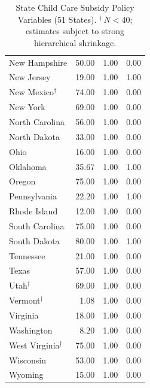 \begin{table}[htbp]
\begin{tabular}{lrrr}
  New Hampshire & 50.00 & 1.00 & 0.00 \\ 
  New Jersey & 19.00 & 1.00 & 1.00 \\ 
  New Mexico$^{\dagger}$ & 74.00 & 1.00 & 0.00 \\ 
  New York & 69.00 & 1.00 & 0.00 \\ 
  North Carolina & 56.00 & 1.00 & 0.00 \\ 
  North Dakota & 33.00 & 1.00 & 0.00 \\ 
  Ohio & 16.00 & 1.00 & 0.00 \\ 
  Oklahoma & 35.67 & 1.00 & 1.00 \\ 
  Oregon & 75.00 & 1.00 & 0.00 \\ 
  Pennsylvania & 22.20 & 1.00 & 1.00 \\ 
  Rhode Island & 12.00 & 1.00 & 0.00 \\ 
  South Carolina & 75.00 & 1.00 & 0.00 \\ 
  South Dakota & 80.00 & 1.00 & 1.00 \\ 
  Tennessee & 21.00 & 1.00 & 0.00 \\ 
  Texas & 57.00 & 1.00 & 0.00 \\ 
  Utah$^{\dagger}$ & 69.00 & 1.00 & 0.00 \\ 
  Vermont$^{\dagger}$ & 1.08 & 1.00 & 0.00 \\ 
  Virginia & 18.00 & 1.00 & 0.00 \\ 
  Washington & 8.20 & 1.00 & 0.00 \\ 
  West Virginia$^{\dagger}$ & 75.00 & 1.00 & 0.00 \\ 
  Wisconsin & 53.00 & 1.00 & 0.00 \\ 
  Wyoming & 15.00 & 1.00 & 0.00 \\ 
   \bottomrule
\end{tabular}
\caption{State Child Care Subsidy Policy Variables (51 States). $^{\dagger}$\,$N < 40$; estimates subject to strong hierarchical shrinkage.} 
\end{table}
